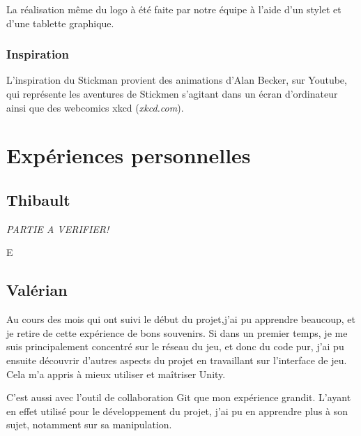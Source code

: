 \documentclass[12pt]{report}
\begin{document}
La réalisation même du logo à été faite par notre équipe à l’aide d’un stylet et
d’une tablette graphique.

\subsection{Inspiration}

L’inspiration du Stickman provient des animations d’Alan Becker, sur Youtube,
qui représente les aventures de Stickmen s’agitant dans un écran d’ordinateur
ainsi que des webcomics xkcd (\textit{xkcd.com}). 

\chapter{Expériences personnelles}

\section{Thibault}

\textit{PARTIE A VERIFIER!}

E%

\section{Valérian}

Au cours des mois qui ont suivi le début du projet,j’ai pu apprendre beaucoup, 
et je retire de cette expérience de bons souvenirs. Si dans un premier temps,
 je me suis principalement concentré sur le réseau du jeu, et donc du code pur, 
j’ai pu ensuite découvrir d’autres aspects du projet en travaillant sur 
l’interface de jeu. Cela m’a appris à mieux utiliser et maîtriser Unity.

C’est aussi avec l’outil de collaboration Git que mon expérience grandit.
 L’ayant en effet utilisé pour le développement du projet, j’ai pu en 
apprendre plus à son sujet, notamment sur sa manipulation. 
\end{document}
